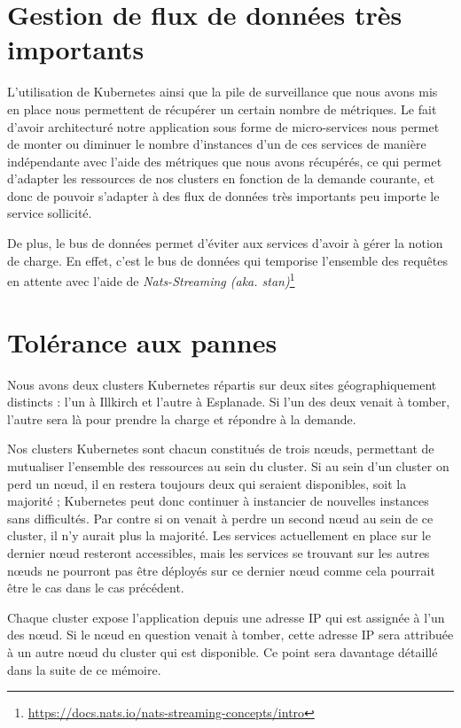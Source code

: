 \section{Gestion de flux de données très importants}

L'utilisation de Kubernetes ainsi que la pile de surveillance que nous
avons mis en place nous permettent de récupérer un certain nombre de
métriques. Le fait d'avoir architecturé notre application sous forme de
micro-services nous permet de monter ou diminuer le nombre d'instances
d'un de ces services de manière indépendante avec l'aide des métriques
que nous avons récupérés, ce qui permet d'adapter les ressources de nos
clusters en fonction de la demande courante, et donc de pouvoir
s'adapter à des flux de données très importants peu importe le service
sollicité.

De plus, le bus de données permet d'éviter aux services d'avoir à gérer
la notion de charge. En effet, c'est le bus de données qui temporise
l'ensemble des requêtes en attente avec l'aide de \textit{Nats-Streaming
(aka. stan)}\footnote{\url{https://docs.nats.io/nats-streaming-concepts/intro}}

\section{Tolérance aux pannes}

Nous avons deux clusters Kubernetes répartis sur deux sites
géographiquement distincts : l'un à Illkirch et l'autre à Esplanade. Si
l'un des deux venait à tomber, l'autre sera là pour prendre la charge et
répondre à la demande.

Nos clusters Kubernetes sont chacun constitués de trois nœuds,
permettant de mutualiser l'ensemble des ressources au sein du cluster.
Si au sein d'un cluster on perd un nœud, il en restera toujours deux qui
seraient disponibles, soit la majorité ; Kubernetes peut donc continuer
à instancier de nouvelles instances sans difficultés. Par contre si on
venait à perdre un second nœud au sein de ce cluster, il n'y aurait plus
la majorité. Les services actuellement en place sur le dernier nœud
resteront accessibles, mais les services se trouvant sur les autres
nœuds ne pourront pas être déployés sur ce dernier nœud comme cela
pourrait être le cas dans le cas précédent.

Chaque cluster expose l'application depuis une adresse IP qui est
assignée à l'un des nœud. Si le nœud en question venait à tomber, cette
adresse IP sera attribuée à un autre nœud du cluster qui est disponible.
Ce point sera davantage détaillé dans la suite de ce mémoire.

